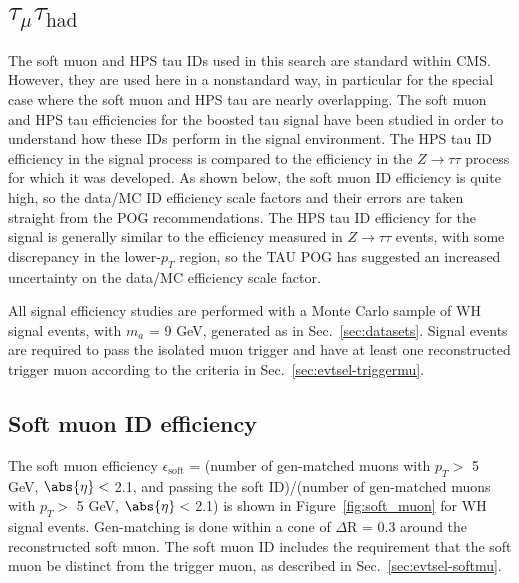 \section{$\tau_{\mu}\tau_{\text{had}}$\label{lepid-eff-muPlusX}}

The soft muon and HPS tau IDs used in this search are standard within CMS.  However, they are used here in a nonstandard way, in particular for the special case where the soft muon and HPS tau are nearly overlapping. %
The soft muon and HPS tau efficiencies for the boosted tau signal have been studied in order to understand how these IDs perform in the signal environment. The HPS tau ID efficiency in the signal process is compared to the efficiency in the $Z\rightarrow\tau\tau$ process for which it was developed.  As shown below, the soft muon ID efficiency is quite high, so the data/MC ID efficiency scale factors and their errors are taken straight from the POG recommendations. The HPS tau ID efficiency for the signal is generally similar to the efficiency measured in $Z\rightarrow\tau\tau$ events, with some discrepancy in the lower-$p_T$ region, so the TAU POG has suggested an increased uncertainty on the data/MC efficiency scale factor.

All signal efficiency studies are performed with a Monte Carlo sample of WH signal events, with $m_{a}$ = 9 GeV, generated as in Sec.~\ref{sec:datasets}.  Signal events are required to pass the isolated muon trigger and have at least one reconstructed trigger muon according to the criteria in Sec.~\ref{sec:evtsel-triggermu}.

\subsection{Soft muon ID efficiency\label{sec:soft-mu-id}}

The soft muon efficiency $\epsilon_{\text{soft}}$ = (number of gen-matched muons with $p_T >$ 5 GeV, $\abs{\eta} <$ 2.1, and passing the soft ID)/(number of gen-matched muons with $p_T >$ 5 GeV, $\abs{\eta} <$ 2.1) is shown in Figure~\ref{fig:soft_muon} for WH signal events.  Gen-matching is done within a cone of $\Delta$R = 0.3 around the reconstructed soft muon.  The soft muon ID includes the requirement that the soft muon be distinct from the trigger muon, as described in Sec.~\ref{sec:evtsel-softmu}.

